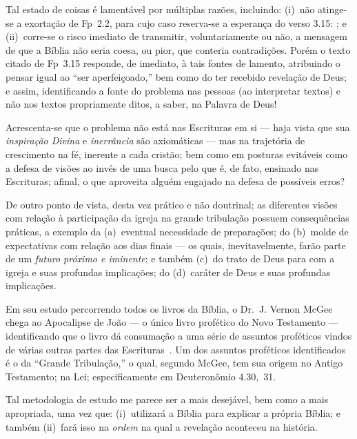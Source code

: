     Tal estado de coisas é lamentável por múltiplas razões, incluindo: (i)~não atinge-se a exortação de Fp~2.2, para  cujo  caso
    reserva-se a esperança do verso 3.15: ; e (ii)~corre-se o  risco
    imediato de transmitir, voluntariamente ou não, a mensagem  de  que  a  Bíblia  não  seria  coesa,  ou  pior,  que  conteria
    contradições. Porém o texto citado de Fp~3.15 responde, de imediato, à tais fontes de lamento, atribuindo o pensar igual  ao
    ``ser aperfeiçoado,'' bem como do ter recebido revelação de Deus; e assim, identificando a fonte do problema nas pessoas (ao
    interpretar textos) e não nos textos propriamente ditos, a saber, na Palavra de Deus!

    Acrescenta-se que  o  problema  não  está  nas  Escrituras  em  si  ---  haja  vista  que  sua  \emph{inspiração  Divina}  e
    \emph{inerrância} são axiomáticas --- mas na trajetória de crescimento na fé, inerente a cada cristão; bem como em  posturas
    evitáveis como a defesa de visões ao invés de uma busca pelo que  é,  de  fato,  ensinado  nas  Escrituras;  afinal,  o  que
    aproveita alguém engajado na defesa de possíveis erros?

    De outro ponto de vista, desta vez prático e não doutrinal; as diferentes visões com relação à  participação  da  igreja  na
    grande tribulação possuem consequências práticas, a exemplo da (a)~eventual necessidade  de  preparações;  do  (b)~molde  de
    expectativas com relação aos dias finais --- os quais, inevitavelmente, farão parte de um \emph{futuro próximo e  iminente};
    e também (c)~do trato de Deus para com a igreja e suas profundas implicações;  do  (d)~caráter  de  Deus  e  suas  profundas
    implicações.

    Em seu estudo percorrendo todos os livros da Bíblia, o Dr.~J. Vernon McGee chega ao Apocalipse de João  ---  o  único  livro
    profético do Novo Testamento --- identificando que o livro dá consumação a uma série de assuntos proféticos vindos de várias
    outras partes das  Escrituras~\cite{ca1980-McGeeJV-49Rev}.  Um  dos  assuntos  proféticos  identificados  é  o  da  ``Grande
    Tribulação,'' o qual, segundo McGee, tem sua origem no Antigo Testamento; na Lei; especificamente em Deuteronômio 4.30,~31.

    Tal metodologia de estudo me parece ser a mais desejável, bem como a mais apropriada, uma vez que:  (i)~utilizará  a  Bíblia
    para explicar a própria Bíblia; e também (ii)~fará isso na \emph{ordem} na qual a revelação aconteceu na história.

